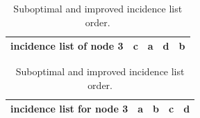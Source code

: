 \begin{table}[htp]
          \centering
    \begin{tabular}{|l | c | c | c | c |}\hline
     incidence list of node 3 &  c & a & d & b\\ \hline
    \end{tabular}
    \vspace{0.5cm}
    
    \begin{tabular}{|l | c | c | c | c |}\hline
     incidence list for node 3 &  a & b & c & d\\ \hline
    \end{tabular}
      \caption{Suboptimal and improved incidence list order.}
    \label{inc-ord}
\end{table}
